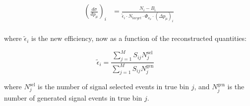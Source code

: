 \begin{equation}
\label{eq:xsec_smeared}
\begin{split}
\left ( \frac{d\sigma}{dp_\mu} \right )_i &= \frac{N_i - B_i}{ \tilde{\epsilon}_i \cdot N_{target} \cdot \Phi_{\nu_\mu} \cdot (\Delta p_\mu)_i}\\
\end{split}
\end{equation}

where $\tilde{\epsilon}_i$ is the new efficiency, now as a function of the reconstructed quantities:

\begin{equation}
\label{eq:eff_smear}
\tilde{\epsilon}_i = \frac{ \sum_{j=1}^{M} S_{ij}N^\text{sel}_j}{ \sum_{j=1}^{M} S_{ij}N^\text{gen}_j} \quad 
\end{equation}

where $N^\text{sel}_j$ is the number of signal selected events in true bin $j$, and $N^\text{gen}_j$ is the number of generated signal events in true bin $j$.

